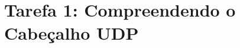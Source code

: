 \section*{Tarefa 1: Compreendendo o Cabeçalho UDP}

\begin{questions}
   
   
   
   
   
\end{questions}